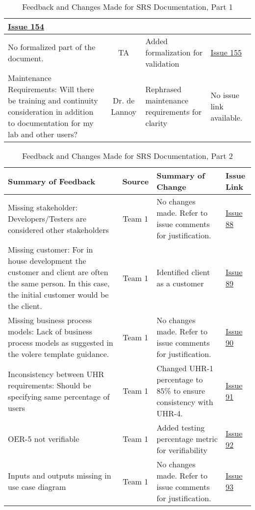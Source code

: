 \documentclass{article}
\begin{document}
\begin{table}[H]
\begin{tabularx}{\textwidth}{|X|c|X|p{1cm}|}
    \href{https://github.com/SumanyaG/Alkalytics/issues/154}{Issue 154}
    \\
    \hline
    No formalized part of the document. & TA & Added formalization for validation &
    \href{https://github.com/SumanyaG/Alkalytics/issues/155}{Issue 155} \\
    \hline
    Maintenance Requirements: Will there be training and continuity
    consideration in addition to documentation for my lab and other users? & Dr.
    de Lannoy & Rephrased maintenance requirements for clarity & No
    issue link available. \\
    \hline
\end{tabularx}
\caption{Feedback and Changes Made for SRS Documentation, Part 1}
\label{table:SRS1}
\end{table}

\begin{table}[H]
\centering
\begin{tabularx}{\textwidth}{|X|c|X|p{1cm}|}
    \hline
    \textbf{Summary of Feedback} & \textbf{Source} & \textbf{Summary of Change} &
    \textbf{Issue Link} \\
    \hline
    Missing stakeholder: Developers/Testers are considered other stakeholders &
    Team 1 & No changes made. Refer to issue comments for justification. &
    \href{https://github.com/SumanyaG/Alkalytics/issues/88}{Issue 88}\\
    \hline
    Missing customer: For in house development the customer and client are often
    the same person. In this case, the initial customer would be the client. &
    Team 1 & Identified client as a customer &
    \href{https://github.com/SumanyaG/Alkalytics/issues/89}{Issue 89}\\
    \hline
    Missing business process models: Lack of business process models as
    suggested in the volere template guidance. & Team 1 & No changes made. Refer
    to issue comments for justification. &
    \href{https://github.com/SumanyaG/Alkalytics/issues/90}{Issue
    90}\\
    \hline
    Inconsistency between UHR requirements: Should be specifying same percentage
    of users & Team 1 & Changed UHR-1 percentage to 85\% to ensure consistency
    with UHR-4. & \href{https://github.com/SumanyaG/Alkalytics/issues/91}{Issue
    91}\\
    \hline
    OER-5 not verifiable & Team 1 & Added testing percentage metric for
    verifiability &
    \href{https://github.com/SumanyaG/Alkalytics/issues/92}{Issue 92} \\
    \hline
    Inputs and outputs missing in use case diagram & Team 1 & No changes made.
    Refer to issue comments for justification. &
    \href{https://github.com/SumanyaG/Alkalytics/issues/93}{Issue 93}\\
    \hline
\end{tabularx}
\caption{Feedback and Changes Made for SRS Documentation, Part 2}
\label{table:SRS2}
\end{table}
\end{document}
